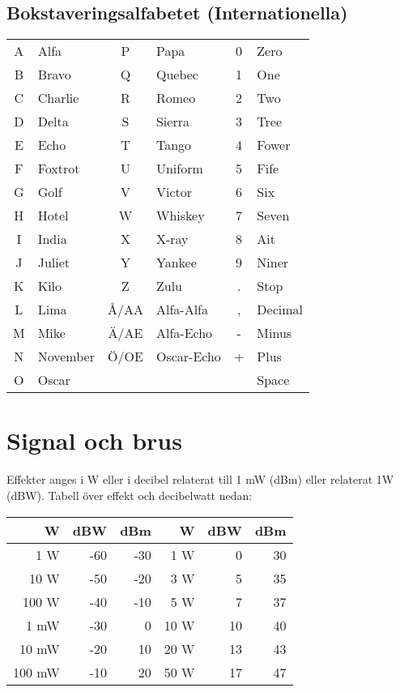 \documentclass[10pt,swedish,a4paper,twoside]{article}
\begin{document}
\subsection{Bokstaveringsalfabetet (Internationella)}
\begin{center}
\begin{tabular}{cl|cl|cl}
	A & Alfa     &  P   & Papa       & 0 & Zero    \\
	B & Bravo    &  Q   & Quebec     & 1 & One     \\
	C & Charlie  &  R   & Romeo      & 2 & Two     \\
	D & Delta    &  S   & Sierra     & 3 & Tree    \\
	E & Echo     &  T   & Tango      & 4 & Fower   \\
	F & Foxtrot  &  U   & Uniform    & 5 & Fife    \\
	G & Golf     &  V   & Victor     & 6 & Six     \\
	H & Hotel    &  W   & Whiskey    & 7 & Seven   \\
	I & India    &  X   & X-ray      & 8 & Ait     \\
	J & Juliet   &  Y   & Yankee     & 9 & Niner   \\
	K & Kilo     &  Z   & Zulu       & . & Stop    \\
	L & Lima     & Å/AA & Alfa-Alfa  & , & Decimal \\
	M & Mike     & Ä/AE & Alfa-Echo  & - & Minus   \\
	N & November & Ö/OE & Oscar-Echo & + & Plus    \\
	O & Oscar    &      &            &   & Space
\end{tabular}
\end{center}

\section{Signal och brus}

Effekter anges i W eller i decibel relaterat till 1 mW (dBm) eller relaterat 1W (dBW). Tabell över effekt och decibelwatt nedan:
\begin{center}
\begin{tabular}{rrr|rrr}
	            \textbf{W} & \textbf{dBW} & \textbf{dBm} &    \textbf{W} & \textbf{dBW} & \textbf{dBm} \\ \hline
	  1 \textmu W & -60 & -30 &  1 W &   0 &  30 \\
	 10 \textmu W & -50 & -20 &  3 W &   5 &  35 \\
	100 \textmu W & -40 & -10 &  5 W &   7 &  37 \\
	         1 mW & -30 &   0 & 10 W &  10 &  40 \\
	        10 mW & -20 &  10 & 20 W &  13 &  43 \\
	       100 mW & -10 &  20 & 50 W &  17 &  47
\end{tabular}
\end{center}
\end{document}

